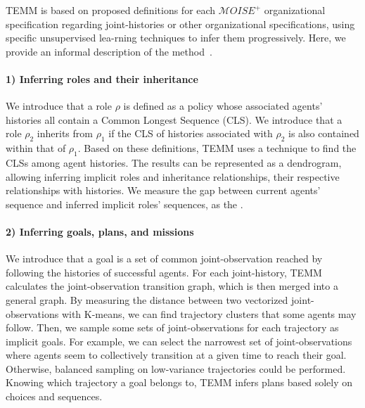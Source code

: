 \documentclass[pdflatex,sn-mathphys-num]{sn-jnl}%
\theoremstyle{thmstyleone}%
\theoremstyle{thmstyletwo}%
\theoremstyle{thmstylethree}%
\begin{document}
TEMM is based on proposed definitions for each $\mathcal{M}OISE^+$ organizational specification regarding joint-histories or other organizational specifications, using specific unsupervised lea-rning techniques to infer them progressively. Here, we provide an informal description of the method~\hyperref[fn:github]{\footnotemark[2]}.
%

\paragraph{1) Inferring roles and their inheritance}

We introduce that a role $\rho$ is defined as a policy whose associated agents' histories all contain a Common Longest Sequence (CLS). We introduce that a role $\rho_2$ inherits from $\rho_1$ if the CLS of histories associated with $\rho_2$ is also contained within that of $\rho_1$.
Based on these definitions, TEMM uses a  technique to find the CLSs among agent histories. The results can be represented as a dendrogram, allowing inferring implicit roles and inheritance relationships, their respective relationships with histories.
We measure the gap between current agents' sequence and inferred implicit roles' sequences, as the .

\paragraph{2) Inferring goals, plans, and missions}

We introduce that a goal is a set of common joint-observation reached by following the histories of successful agents.
For each joint-history, TEMM calculates the joint-observation transition graph, which is then merged into a general graph. By measuring the distance between two vectorized joint-observations with K-means, we can find trajectory clusters that some agents may follow. Then, we sample some sets of joint-observations for each trajectory as implicit goals. For example, we can select the narrowest set of joint-observations where agents seem to collectively transition at a given time to reach their goal. Otherwise, balanced sampling on low-variance trajectories could be performed. Knowing which trajectory a goal belongs to, TEMM infers plans based solely on choices and sequences.
\end{document}
